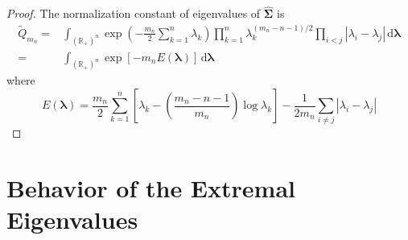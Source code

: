 \begin{proof}
    The normalization constant of eigenvalues of $\widehat{\boldsymbol{\Sigma}}$ is
    \begin{equation*}
        \begin{aligned}
            \widetilde{Q}_{m_{n}}= & \int_{\left(\mathbb{R}_{+}\right)^{n}}\exp\left(-\frac{m_{n}}{2}\sum_{k=1}^{n}\lambda_{k}\right)\prod_{k=1}^{n}\lambda_{k}^{(m_{n}-n-1)/2}\prod_{i<j}\left|\lambda_{i}-\lambda_{j}\right|\,\mathrm{d}\boldsymbol{\lambda} \\
            =                      & \int_{\left(\mathbb{R}_{+}\right)^{n}}\exp\left[-m_{n}E\left(\boldsymbol{\lambda}\right)\right]\,\mathrm{d}\boldsymbol{\lambda}
        \end{aligned}
    \end{equation*}
    where
    \begin{equation*}
        E\left(\boldsymbol{\lambda}\right)=\frac{m_{n}}{2}\sum_{k=1}^{n}\left[\lambda_{k}-\left(\frac{m_{n}-n-1}{m_{n}}\right)\log\lambda_{k}\right]-\frac{1}{2m_{n}}\sum_{i\neq j}\left|\lambda_{i}-\lambda_{j}\right|
    \end{equation*}
\end{proof}


\section{Behavior of the Extremal Eigenvalues}